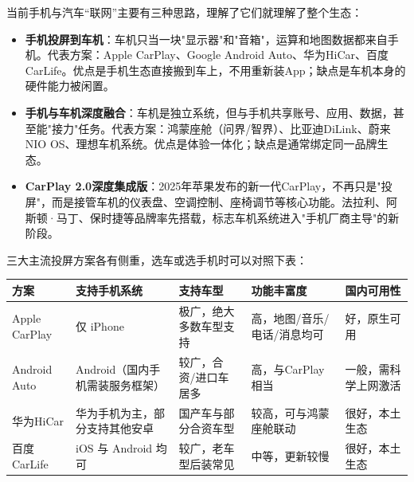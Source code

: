 


当前手机与汽车“联网”主要有三种思路，理解了它们就理解了整个生态：

\begin{itemize}
  \item \textbf{手机投屏到车机}：车机只当一块"显示器"和"音箱"，运算和地图数据都来自手机。代表方案：Apple CarPlay、Google Android Auto、华为HiCar、百度CarLife。优点是手机生态直接搬到车上，不用重新装App；缺点是车机本身的硬件能力被闲置。
  \item \textbf{手机与车机深度融合}：车机是独立系统，但与手机共享账号、应用、数据，甚至能"接力"任务。代表方案：鸿蒙座舱（问界/智界）、比亚迪DiLink、蔚来NIO OS、理想车机系统。优点是体验一体化；缺点是通常绑定同一品牌生态。
  \item \textbf{CarPlay 2.0深度集成版}：2025年苹果发布的新一代CarPlay，不再只是"投屏"，而是接管车机的仪表盘、空调控制、座椅调节等核心功能。法拉利、阿斯顿·马丁、保时捷等品牌率先搭载，标志车机系统进入"手机厂商主导"的新阶段。
\end{itemize}


三大主流投屏方案各有侧重，选车或选手机时可以对照下表：

\begin{center}
\begin{tabularx}{\linewidth}{|X|X|X|X|X|}
\hline
\textbf{方案} & \textbf{支持手机系统} & \textbf{支持车型} & \textbf{功能丰富度} & \textbf{国内可用性} \tabularnewline
\hline
Apple CarPlay & 仅 iPhone & 极广，绝大多数车型支持 & 高，地图/音乐/电话/消息均可 & 好，原生可用 \tabularnewline
Android Auto & Android（国内手机需装服务框架） & 较广，合资/进口车居多 & 高，与CarPlay相当 & 一般，需科学上网激活 \tabularnewline
华为HiCar & 华为手机为主，部分支持其他安卓 & 国产车与部分合资车型 & 较高，可与鸿蒙座舱联动 & 很好，本土生态 \tabularnewline
百度CarLife & iOS 与 Android 均可 & 较广，老车型后装常见 & 中等，更新较慢 & 很好，本土生态 \tabularnewline
\hline
\end{tabularx}
\end{center}


